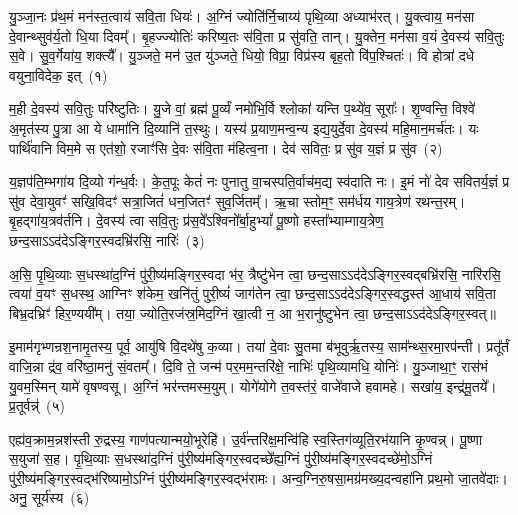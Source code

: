 \setcounter{anuvakam}{0}
यु॒ञ्जा॒नः प्र॑थ॒मं मन॑स्त॒त्वाय॑ सवि॒ता धियः॑। अ॒ग्निं ज्योति॑र्नि॒चाय्य॑ पृथि॒व्या अध्याभ॑रत्। यु॒क्त्वाय॒ मन॑सा दे॒वान्थ्सुव॑र्य॒तो धि॒या दिवम्᳚। बृ॒हज्ज्योतिः॑ करिष्य॒तः स॑वि॒ता प्र सु॑वति॒ तान्। यु॒क्तेन॒ मन॑सा व॒यं दे॒वस्य॑ सवि॒तुः स॒वे। सु॒व॒र्गेया॑य॒ शक्त्यै᳚। यु॒ञ्जते॒ मन॑ उ॒त यु॑ञ्जते॒ धियो॒ विप्रा॒ विप्र॑स्य बृह॒तो वि॑प॒श्चितः॑। वि होत्रा॑ दधे वयुना॒विदेक॒ इत्~(१)

म॒ही दे॒वस्य॑ सवि॒तुः परि॑ष्टुतिः। यु॒जे वां॒ ब्रह्म॑ पू॒र्व्यं नमो॑भि॒र्वि श्लोका॑ यन्ति प॒थ्ये॑व॒ सूराः᳚। शृ॒ण्वन्ति॒ विश्वे॑ अ॒मृत॑स्य पु॒त्रा आ ये धामा॑नि दि॒व्यानि॑ त॒स्थुः। यस्य॑ प्र॒याण॒मन्व॒न्य इद्य॒युर्दे॒वा दे॒वस्य॑ महि॒मान॒मर्च॑तः। यः पार्थि॑वानि विम॒मे स एत॑शो॒ रजाꣳ॑सि दे॒वः स॑वि॒ता म॑हित्व॒ना। देव॑ सवितः॒ प्र सु॑व य॒ज्ञं प्र सु॑व~(२)

य॒ज्ञप॑ति॒म्भगा॑य दि॒व्यो ग॑न्ध॒र्वः। के॒त॒पूः केतं॑ नः पुनातु वा॒चस्पति॒र्वाच॑म॒द्य स्व॑दाति नः। इ॒मं नो॑ देव सवितर्य॒ज्ञं प्र सु॑व देवा॒युवꣳ॑ सखि॒विदꣳ॑ सत्रा॒जितं॑ धन॒जितꣳ॑ सुव॒र्जितम्᳚। ऋ॒चा स्तोम॒ꣳ॒ सम॑र्धय गाय॒त्रेण॑ रथन्त॒रम्। बृ॒हद्गा॑य॒त्रव॑र्तनि। दे॒वस्य॑ त्वा सवि॒तुः प्र॑स॒वे᳚\-ऽश्विनो᳚र्बा॒हु\-भ्यां᳚ पू॒ष्णो हस्ता᳚भ्याम्गाय॒त्रेण॒ छन्द॒सा\-ऽ\-ऽद॑दे\-ऽङ्गिर॒स्वदभ्रि॑रसि॒ नारिः॑~(३)

अ॒सि॒ पृ॒थि॒व्याः स॒धस्था॑द॒ग्निं पु॑री॒ष्य॑मङ्गिर॒स्वदा भ॑र॒ त्रैष्टु॑भेन त्वा॒ छन्द॒सा\-ऽ\-ऽद॑दे\-ऽङ्गिर॒स्वद्बभ्रि॑रसि॒ नारि॑रसि॒ त्वया॑ व॒यꣳ स॒धस्थ॒ आग्निꣳ श॑केम॒ खनि॑तुं पुरी॒ष्यं॑ जाग॑तेन त्वा॒ छन्द॒सा\-ऽ\-ऽद॑दे\-ऽङ्गिर॒स्वद्धस्त॑ आ॒धाय॑ सवि॒ता बिभ्र॒दभ्रिꣳ॑ हिर॒ण्ययी᳚म्। तया॒ ज्योति॒रज॑स्र॒मिद॒ग्निं खा॒त्वी न॒ आ भ॒रानु॑ष्टुभेन त्वा॒ छन्द॒सा\-ऽ\-ऽद॑दे\-ऽङ्गिर॒स्वत्॥

{\anuvakamend[{इद्य॒ज्ञं प्र सु॑व॒ नारि॒रानु॑ष्टुभेन त्वा॒ छन्द॑सा॒ त्रीणि॑ च}]}%

इ॒माम॑गृभ्णन्रश॒नामृ॒तस्य॒ पूर्व॒ आयु॑षि वि॒दथे॑षु क॒व्या। तया॑ दे॒वाः सु॒तमा ब॑भूवुर्\mbox{}ऋ॒तस्य॒ साम᳚न्थ्स॒रमा॒रप॑न्ती। प्रतू᳚र्तं वाजि॒न्ना द्र॑व॒ वरि॑ष्ठा॒मनु॑ सं॒वतम्᳚। दि॒वि ते॒ जन्म॑ पर॒मम॒न्तरि॑क्षे॒ नाभिः॑ पृथि॒व्यामधि॒ योनिः॑। यु॒ञ्जाथा॒ꣳ॒ रास॑भं यु॒वम॒स्मिन् यामे॑ वृषण्वसू। अ॒ग्निं भर॑न्तमस्म॒युम्। योगे॑योगे त॒वस्त॑रं॒ वाजे॑वाजे हवामहे। सखा॑य॒ इन्द्र॑मू॒तये᳚। प्र॒तूर्वन्न्॑~(५)

एह्य॑व॒क्राम॒न्नश॑स्ती रु॒द्रस्य॒ गाण॑पत्यान्मयो॒भूरेहि॑। उ॒र्व॑न्तरि॑क्ष॒मन्वि॑हि स्व॒स्तिग॑व्यूति॒रभ॑यानि कृ॒ण्वन्न्। पू॒ष्णा स॒युजा॑ स॒ह। पृ॒थि॒व्याः स॒धस्था॑द॒ग्निं पु॑री॒ष्य॑मङ्गिर॒स्वदच्छे᳚ह्य॒ग्निं पु॑री॒ष्य॑मङ्गिर॒स्वदच्छे॑मो॒\-ऽग्निं पु॑री॒ष्य॑मङ्गिर॒\-स्वद्भ॑रिष्यामो॒\-ऽग्निं पु॑री॒ष्य॑मङ्गिर॒स्वद्भ॑रामः। अन्व॒ग्निरु॒षसा॒मग्र॑मख्य॒दन्वहा॑नि प्रथ॒मो जा॒तवे॑दाः। अनु॒ सूर्य॑स्य~(६)

